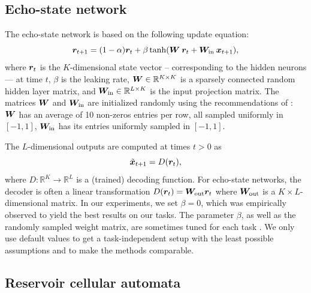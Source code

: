 \subsection{Echo-state network}
The echo-state network is based on the following update equation:
\begin{equation}
  \label{eq:esn}
  {\bm{r}}_{t + 1} = (1 - \alpha) {\bm{r}}_{t} +
  \beta \tanh({\bm{W}}\: {\bm{r}}_{t} + {\bm{W}}_{\text{in}}\: {\bm{x}}_{t + 1}),
\end{equation}
where ${\bm{r}}_{t}$ is the $K$-dimensional state vector -- corresponding to the hidden neurons
--- at time $t$, $\beta$ is the leaking rate, ${\bm{W}} \in \mathbb{R}^{K \times K}$ is a sparsely
connected random hidden layer matrix, and ${\bm{W}}_{\text{in}} \in \mathbb{R}^{L \times K}$ is the
input projection matrix. The matrices ${\bm{W}}$ and ${\bm{W}}_{\text{in}}$ are
initialized randomly using the recommendations of
\parencite{jaegerLongShortTermMemory2012}: ${\bm{W}}$ has an average of 10 non-zeros
entries per row, all sampled uniformly in $[-1, 1]$, ${\bm{W}}_{\text{in}}$ has its
entries uniformly sampled in $[-1, 1]$.

The $L$-dimensional outputs are computed at times $t > 0$ as
\begin{equation}
  \label{eq:esn-res}
\tilde{{\bm{x}}}_{t+ 1} = D({\bm{r}}_{t}),
\end{equation}
where $D: \mathbb{R}^{K} \rightarrow \mathbb{R}^{L}$ is a (trained) decoding function. For echo-state networks, the
decoder is often a linear transformation
$D({\bm{r}}_{t}) = {\bm{W}}_{\text{out}} {\bm{r}}_{t}$ where ${\bm{W}}_{\text{out}}$ is a
$K \times L$-dimensional matrix. In our experiments, we set $\beta = 0$, which was
empirically observed to yield the best results on our tasks. The parameter $\beta$,
as well as the randomly sampled weight matrix, are sometimes tuned for each task
\parencite{jaegerLongShortTermMemory2012}. We only use
default values to get a task-independent setup with
the least possible assumptions and to make the methods comparable.

\subsection{Reservoir cellular automata\label{sec:app-ca-res}}

